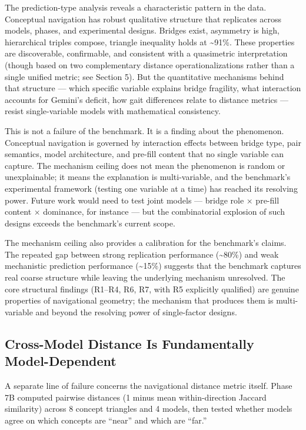 The prediction-type analysis reveals a characteristic pattern in the data. Conceptual navigation has robust qualitative structure that replicates across models, phases, and experimental designs. Bridges exist, asymmetry is high, hierarchical triples compose, triangle inequality holds at \textasciitilde91\%. These properties are discoverable, confirmable, and consistent with a quasimetric interpretation (though based on two complementary distance operationalizations rather than a single unified metric; see Section 5). But the quantitative mechanisms behind that structure --- which specific variable explains bridge fragility, what interaction accounts for Gemini's deficit, how gait differences relate to distance metrics --- resist single-variable models with mathematical consistency.

This is not a failure of the benchmark. It is a finding about the phenomenon. Conceptual navigation is governed by interaction effects between bridge type, pair semantics, model architecture, and pre-fill content that no single variable can capture. The mechanism ceiling does not mean the phenomenon is random or unexplainable; it means the explanation is multi-variable, and the benchmark's experimental framework (testing one variable at a time) has reached its resolving power. Future work would need to test joint models --- bridge role × pre-fill content × dominance, for instance --- but the combinatorial explosion of such designs exceeds the benchmark's current scope.

The mechanism ceiling also provides a calibration for the benchmark's claims. The repeated gap between strong replication performance (\textasciitilde80\%) and weak mechanistic prediction performance (\textasciitilde15\%) suggests that the benchmark captures real coarse structure while leaving the underlying mechanism unresolved. The core structural findings (R1--R4, R6, R7, with R5 explicitly qualified) are genuine properties of navigational geometry; the mechanism that produces them is multi-variable and beyond the resolving power of single-factor designs.

\subsection{Cross-Model Distance Is Fundamentally Model-Dependent}\label{cross-model-distance-is-fundamentally-model-dependent}

A separate line of failure concerns the navigational distance metric itself. Phase 7B computed pairwise distances (1 minus mean within-direction Jaccard similarity) across 8 concept triangles and 4 models, then tested whether models agree on which concepts are ``near'' and which are ``far.''

